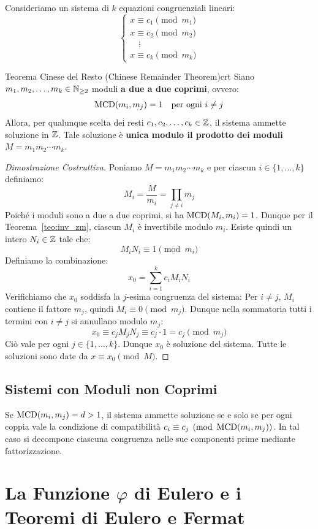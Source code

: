 Consideriamo un sistema di $k$ equazioni congruenziali lineari:
\[
\begin{cases}
    x \equiv c_1 \pmod{m_1} \\
    x \equiv c_2 \pmod{m_2} \\
    \quad \vdots \\
    x \equiv c_k \pmod{m_k}
\end{cases}
\]

\begin{teorema}{Teorema Cinese del Resto (Chinese Remainder Theorem)}{crt}
Siano $m_1, m_2, \dots, m_k \in \mathbb{N}_{\ge 2}$ moduli \textbf{a due a due coprimi}, ovvero:
\[
    \operatorname{MCD}(m_i, m_j) = 1 \quad \text{per ogni } i \neq j
\]
Allora, per qualunque scelta dei resti $c_1, c_2, \dots, c_k \in \mathbb{Z}$, il sistema ammette soluzione in $\mathbb{Z}$.
Tale soluzione è \textbf{unica modulo il prodotto dei moduli} $M = m_1 m_2 \cdots m_k$.
\end{teorema}

\begin{proof}[Dimostrazione Costruttiva]
Poniamo $M = m_1 m_2 \cdots m_k$ e per ciascun $i \in \{1, \dots, k\}$ definiamo:
\[
    M_i = \frac{M}{m_i} = \prod_{j \neq i} m_j
\]
Poiché i moduli sono a due a due coprimi, si ha $\operatorname{MCD}(M_i, m_i) = 1$.
Dunque per il Teorema~\ref{teo:inv_zm}, ciascun $M_i$ è invertibile modulo $m_i$. Esiste quindi un intero $N_i \in \mathbb{Z}$ tale che:
\[
    M_i N_i \equiv 1 \pmod{m_i}
\]
Definiamo la combinazione:
\[
    x_0 = \sum_{i=1}^k c_i M_i N_i
\]
Verifichiamo che $x_0$ soddisfa la $j$-esima congruenza del sistema:
Per $i \neq j$, $M_i$ contiene il fattore $m_j$, quindi $M_i \equiv 0 \pmod{m_j}$.
Dunque nella sommatoria tutti i termini con $i \neq j$ si annullano modulo $m_j$:
\[
    x_0 \equiv c_j M_j N_j \equiv c_j \cdot 1 = c_j \pmod{m_j}
\]
Ciò vale per ogni $j \in \{1, \dots, k\}$. Dunque $x_0$ è soluzione del sistema. Tutte le soluzioni sono date da $x \equiv x_0 \pmod M$.
\end{proof}

\subsection{Sistemi con Moduli non Coprimi}
Se $\operatorname{MCD}(m_i, m_j) = d > 1$, il sistema ammette soluzione se e solo se per ogni coppia vale la condizione di compatibilità $c_i \equiv c_j \pmod{\operatorname{MCD}(m_i, m_j)}$.
In tal caso si decompone ciascuna congruenza nelle sue componenti prime mediante fattorizzazione.

\section{La Funzione $\varphi$ di Eulero e i Teoremi di Eulero e Fermat}

